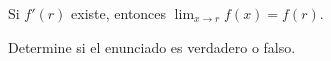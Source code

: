 \item Si $f'(r)$ existe, entonces $\lim_{x \to r} f(x) = f(r)$.
\par
Determine si el enunciado es verdadero o falso.
